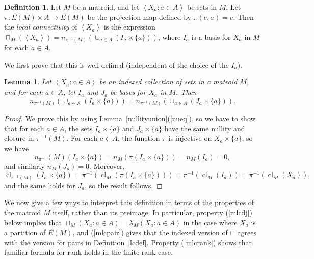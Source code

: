 \documentclass{amsart}
\theoremstyle{plain}
\newtheorem{lemma}[theorem]{Lemma}
\newcounter{defn}
\theoremstyle{definition}
\newtheorem{definition}[defn]{Definition}
\DeclareMathOperator{\cl}{cl}
\newcommand{\br}[1]{\left(#1\right)}
\newcommand{\ab}[1]{\left\langle#1\right\rangle}
\begin{document}
\begin{definition}\label{mlcdef}
  Let $M$ be a matroid, and let $\ab{X_a : a \in A}$ be sets in $M$.
  Let $\pi \colon E(M) \times A \to E(M)$ be the projection map defined by $\pi(e, a) = e$. 
  Then the \emph{local connectivity} of $\ab{X_a}$ 
  is the expression $\sqcap_M(\ab{X_a}) = n_{\pi^{-1}(M)}\br{\cup_{a \in A} (I_a \times \{a\})}$, 
  where $I_a$ is a basis for $X_a$ in $M$ for each $a \in A$. 
\end{definition}


We first prove that this is well-defined (independent of the choice of the $I_a$). 
\begin{lemma}
  Let $\ab{X_a : a \in A}$ be an indexed collection of sets in a matroid $M$, and for each $a \in A$, let $I_a$ and $J_a$ 
  be bases for $X_a$ in $M$. Then 
  \[n_{\pi^{-1}(M)}\br{\cup_{a \in A} (I_a \times \{a\})} = n_{\pi^{-1}(M)}\br{\cup_{a \in A} (J_a \times \{a\})}.\]
\end{lemma}
\begin{proof}
  We prove this by using Lemma~\ref{nullityunion}(\ref{nueq}), so we have to show that for each $a \in A$, 
  the sets $I_a \times \{a\}$ and $J_a \times \{a\}$ have the same nullity and closure in $\pi^{-1}(M)$.  
  For each $a \in A$, the function $\pi$ is injective on $X_a \times \{a\}$, 
  so we have 
  \[n_{\pi^{-1}}(M)(I_a \times \{a\}) = n_M(\pi(I_a \times \{a\})) = n_M(I_a) = 0,\] 
  and similarly $n_M(J_a) = 0$. Moreover, 
  \[\cl_{\pi^{-1}(M)}(I_a \times \{a\}) = \pi^{-1}\br{\cl_M(\pi(I_a \times \{a\}))}= \pi^{-1}\br{\cl_M(I_a)} = \pi^{-1}\br{\cl_M(X_a)},\] 
  and the same holds for $J_a$, so the result follows. 
\end{proof}

We now give a few ways to interpret this definition in terms of the properties of the matroid $M$ itself, 
rather than its preimage.  
In particular, property (\ref{mlcdj}) below implies that $\sqcap_M(X_a : a \in A) = \lambda_M(X_a : a \in A)$ in the 
case where $X_a$ is a partition of $E(M)$, and (\ref{mlcpair}) gives that the indexed version of $\sqcap$ agrees 
with the version for pairs in Definition~\ref{lcdef}. Property (\ref{mlcrank}) shows that familiar formula 
for rank holds in the finite-rank case. 
\end{document}
